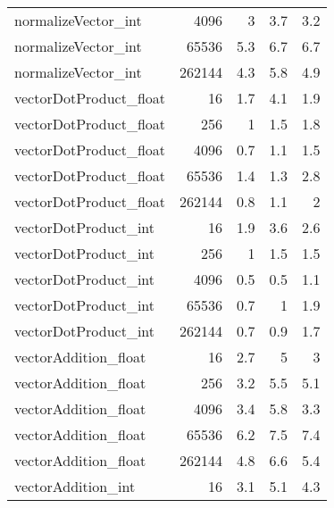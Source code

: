 \begin{tabular}{lrrrr}
 normalizeVector\_int    &   4096 &                 3   &               3.7 &                 3.2 \\
 normalizeVector\_int    &  65536 &                 5.3 &               6.7 &                 6.7 \\
 normalizeVector\_int    & 262144 &                 4.3 &               5.8 &                 4.9 \\
 vectorDotProduct\_float &     16 &                 1.7 &               4.1 &                 1.9 \\
 vectorDotProduct\_float &    256 &                 1   &               1.5 &                 1.8 \\
 vectorDotProduct\_float &   4096 &                 0.7 &               1.1 &                 1.5 \\
 vectorDotProduct\_float &  65536 &                 1.4 &               1.3 &                 2.8 \\
 vectorDotProduct\_float & 262144 &                 0.8 &               1.1 &                 2   \\
 vectorDotProduct\_int   &     16 &                 1.9 &               3.6 &                 2.6 \\
 vectorDotProduct\_int   &    256 &                 1   &               1.5 &                 1.5 \\
 vectorDotProduct\_int   &   4096 &                 0.5 &               0.5 &                 1.1 \\
 vectorDotProduct\_int   &  65536 &                 0.7 &               1   &                 1.9 \\
 vectorDotProduct\_int   & 262144 &                 0.7 &               0.9 &                 1.7 \\
 vectorAddition\_float   &     16 &                 2.7 &               5   &                 3   \\
 vectorAddition\_float   &    256 &                 3.2 &               5.5 &                 5.1 \\
 vectorAddition\_float   &   4096 &                 3.4 &               5.8 &                 3.3 \\
 vectorAddition\_float   &  65536 &                 6.2 &               7.5 &                 7.4 \\
 vectorAddition\_float   & 262144 &                 4.8 &               6.6 &                 5.4 \\
 vectorAddition\_int     &     16 &                 3.1 &               5.1 &                 4.3 \\

\end{tabular}
